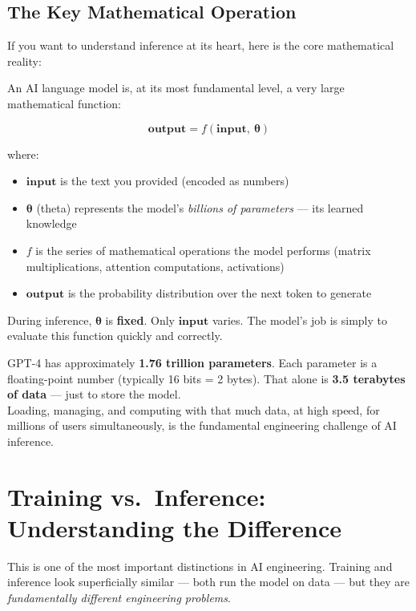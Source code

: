 \documentclass[12pt, twoside, openright]{book}
\begin{document}
\subsection{The Key Mathematical Operation}

If you want to understand inference at its heart, here is the core
mathematical reality:

An AI language model is, at its most fundamental level, a very large
mathematical function:

\[
  \mathbf{output} = f(\mathbf{input},\ \boldsymbol{\theta})
\]

where:
\begin{itemize}
  \item $\mathbf{input}$ is the text you provided (encoded as numbers)
  \item $\boldsymbol{\theta}$ (theta) represents the model's
        \textit{billions of parameters} --- its learned knowledge
  \item $f$ is the series of mathematical operations the model performs
        (matrix multiplications, attention computations, activations)
  \item $\mathbf{output}$ is the probability distribution over the next
        token to generate
\end{itemize}

During inference, $\boldsymbol{\theta}$ is \textbf{fixed}.
Only $\mathbf{input}$ varies.
The model's job is simply to evaluate this function quickly and correctly.

\begin{insightbox}
GPT-4 has approximately \textbf{1.76 trillion parameters}.
Each parameter is a floating-point number (typically 16 bits = 2 bytes).
That alone is \textbf{3.5 terabytes of data} --- just to store the model.\\[4pt]
Loading, managing, and computing with that much data,
at high speed, for millions of users simultaneously,
is the fundamental engineering challenge of AI inference.
\end{insightbox}

\section{Training vs.\ Inference: Understanding the Difference}

This is one of the most important distinctions in AI engineering.
Training and inference look superficially similar --- both run the
model on data --- but they are \textit{fundamentally different
engineering problems}.
\end{document}
